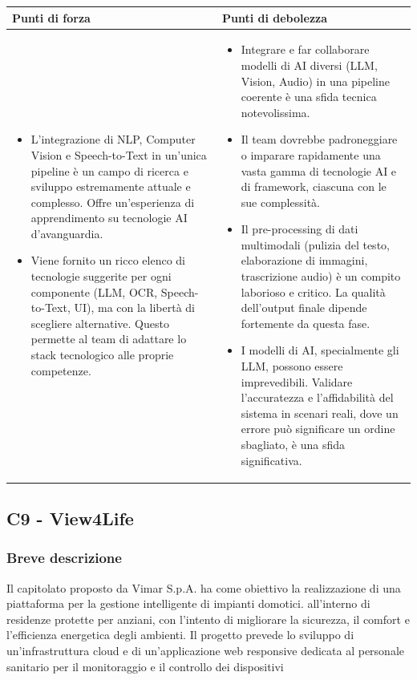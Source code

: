 \documentclass[a4paper,11pt]{article}
\begin{document}
{\footnotesize
\begin{tabularx}{\textwidth}{|X|X|}
\hline
\rowcolor{lightgray!40} %
\textbf{Punti di forza} & \textbf{Punti di debolezza} \\
\hline
\begin{itemize}
\item L'integrazione di NLP, Computer Vision e Speech-to-Text in un'unica pipeline è un campo di ricerca e sviluppo estremamente attuale e complesso. Offre un'esperienza di apprendimento su tecnologie AI d'avanguardia.
\item Viene fornito un ricco elenco di tecnologie suggerite per ogni componente (LLM, OCR, Speech-to-Text, UI), ma con la libertà di scegliere alternative. Questo permette al team di adattare lo stack tecnologico alle proprie competenze.
\end{itemize}
 & \begin{itemize}
\item Integrare e far collaborare modelli di AI diversi (LLM, Vision, Audio) in una pipeline coerente è una sfida tecnica notevolissima.
\item Il team dovrebbe padroneggiare o imparare rapidamente una vasta gamma di tecnologie AI e di framework, ciascuna con le sue complessità.
\item Il pre-processing di dati multimodali (pulizia del testo, elaborazione di immagini, trascrizione audio) è un compito laborioso e critico. La qualità dell'output finale dipende fortemente da questa fase.
\item I modelli di AI, specialmente gli LLM, possono essere imprevedibili. Validare l'accuratezza e l'affidabilità del sistema in scenari reali, dove un errore può significare un ordine sbagliato, è una sfida significativa.
\end{itemize} \\
\hline
\end{tabularx}
}


\newpage
\subsection{C9 - View4Life}
\subsubsection{Breve descrizione}
\parbox[t]{\linewidth}{%
Il capitolato proposto da Vimar S.p.A. ha come obiettivo la realizzazione di una piattaforma per la gestione intelligente di impianti domotici. all'interno di residenze protette per anziani, con l'intento di migliorare la sicurezza, il comfort e l'efficienza energetica degli ambienti. Il progetto prevede lo sviluppo di un'infrastruttura cloud e di un'applicazione web responsive dedicata al personale sanitario per il monitoraggio e il controllo dei dispositivi
}
\end{document}
